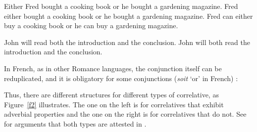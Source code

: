 {\begin{exe}
 \ex
\begin{xlista}
\ex  Either Fred bought a cooking book or he bought a gardening magazine.
\ex  Fred either bought a cooking book or he bought a gardening magazine.
\ex  Fred can either buy a cooking book or he can buy a gardening magazine.
\end{xlista}
\end{exe}


\begin{exe}
 \ex
\begin{xlista}
\ex John will read both the introduction and the conclusion.
\ex John will both read the introduction and the conclusion.
\end{xlista}
\end{exe}



\noindent
In French, as in other Romance languages, the conjunction itself can be reduplicated, and it is
obligatory for some conjunctions (\emph{soit} `or' in French) \parencites{Mouret:05}[--206]{Bilbiie:17}:

\begin{exe}
 \ex
\begin{xlista}
\end{xlista}
\end{exe}

\noindent
Thus, there are  different structures for different types of correlative, as Figure~\ref{f2} illustrates. The one on the left is for correlatives that exhibit adverbial properties and the one on the right is for correlatives that do not.
See \citet[--36]{Bilbiie:08} for arguments that both types are attested in .



}
